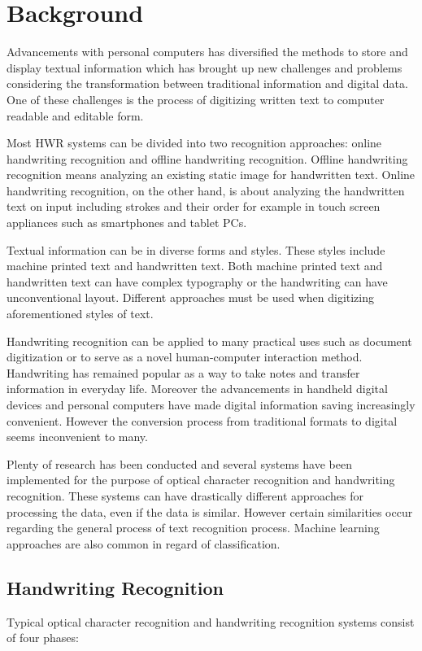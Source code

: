 \documentclass{article}
\begin{document}
  \newpage
  \section{Background}
    Advancements with personal computers has diversified the methods to store and display textual information which has brought up new challenges and problems considering the transformation between traditional information and digital data. One of these challenges is the process of digitizing written text to computer readable and editable form.

    Most HWR systems can be divided into two recognition approaches: online handwriting recognition and offline handwriting recognition. Offline handwriting recognition means analyzing an existing static image for handwritten text. Online handwriting recognition, on the other hand, is about analyzing the handwritten text on input including strokes and their order for example in touch screen appliances such as smartphones and tablet PCs.

    Textual information can be in diverse forms and styles. These styles include machine printed text and handwritten text. Both machine printed text and handwritten text can have complex typography or the handwriting can have unconventional layout. Different approaches must be used when digitizing aforementioned styles of text.

    Handwriting recognition can be applied to many practical uses such as document digitization or to serve as a novel human-computer interaction method. Handwriting has remained popular as a way to take notes and transfer information in everyday life. Moreover the advancements in handheld digital devices and personal computers have made digital information saving increasingly convenient. However the conversion process from traditional formats to digital seems inconvenient to many.

    Plenty of research has been conducted and several systems have been implemented for the purpose of optical character recognition and handwriting recognition. These systems can have drastically different approaches for processing the data, even if the data is similar. However certain similarities occur regarding the general process of text recognition process. Machine learning approaches are also common in regard of classification.


  \subsection{Handwriting Recognition}
    Typical optical character recognition and handwriting recognition systems consist of four phases:
\end{document}
